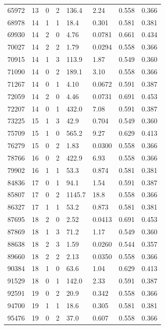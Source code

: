 \documentclass[preview]{standalone}
\begin{document}
{{{\begin{tabular}{L{1.2cm}C{1.2cm} C{0.3cm}C{0.5cm} C{1.4cm}C{1.4cm} C{1.4cm}C{1.4cm}}
  65972  &    13  & 0     &  2 &  136.4  & 2.24  & 0.558 &  0.366   \\ 
  68978  &    14  & 1     &  1 &  18.4  & 0.301  & 0.581 &  0.381   \\ 
  69930  &    14  & 2     &  0 &  4.76  & 0.0781  & 0.661 &  0.434   \\ 
  70027  &    14  & 2     &  2 &  1.79  & 0.0294  & 0.558 &  0.366   \\ 
  70915  &    14  & 1     &  3 &  113.9  & 1.87  & 0.549 &  0.360   \\ 
  71090  &    14  & 0     &  2 &  189.1  & 3.10  & 0.558 &  0.366   \\ 
  71267  &    14  & 0     &  1 &  4.10  & 0.0672  & 0.591 &  0.387   \\ 
  72059  &    14  & 2     &  0 &  4.46  & 0.0731  & 0.691 &  0.453   \\ 
  72207  &    14  & 0     &  1 &  432.0  & 7.08  & 0.591 &  0.387   \\ 
  73225  &    15  & 1     &  3 &  42.9  & 0.704  & 0.549 &  0.360   \\ 
  75709  &    15  & 1     &  0 &  565.2  & 9.27  & 0.629 &  0.413   \\ 
  76279  &    15  & 0     &  2 &  1.83  & 0.0300  & 0.558 &  0.366   \\ 
  78766  &    16  & 0     &  2 &  422.9  & 6.93  & 0.558 &  0.366   \\ 
  79902  &    16  & 1     &  1 &  53.3  & 0.874  & 0.581 &  0.381   \\ 
  84836  &    17  & 0     &  1 &  94.1  & 1.54  & 0.591 &  0.387   \\ 
  85807  &    17  & 0     &  2 &  1145.7  & 18.8  & 0.558 &  0.366   \\ 
  86327  &    17  & 1     &  1 &  53.2  & 0.873  & 0.581 &  0.381   \\ 
  87695  &    18  & 2     &  0 &  2.52  & 0.0413  & 0.691 &  0.453   \\ 
  87869  &    18  & 1     &  3 &  71.2  & 1.17  & 0.549 &  0.360   \\ 
  88638  &    18  & 2     &  3 &  1.59  & 0.0260  & 0.544 &  0.357   \\ 
  89660  &    18  & 2     &  2 &  2.13  & 0.0350  & 0.558 &  0.366   \\ 
  90384  &    18  & 1     &  0 &  63.6  & 1.04  & 0.629 &  0.413   \\ 
  91529  &    18  & 0     &  1 &  142.0  & 2.33  & 0.591 &  0.387   \\ 
  92591  &    19  & 0     &  2 &  20.9  & 0.342  & 0.558 &  0.366   \\ 
  94700  &    19  & 1     &  1 &  18.6  & 0.305  & 0.581 &  0.381   \\ 
  95476  &    19  & 0     &  2 &  37.0  & 0.607  & 0.558 &  0.366   \\ 
\hline 
\end{tabular} 

}}}
\end{document}
